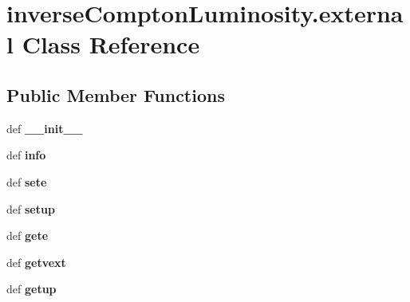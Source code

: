 \hypertarget{classinverseComptonLuminosity_1_1external}{\section{inverse\-Compton\-Luminosity.\-external Class Reference}
\label{classinverseComptonLuminosity_1_1external}
}
\subsection*{Public Member Functions}
\begin{DoxyCompactItemize}
\item 
\hypertarget{classinverseComptonLuminosity_1_1external_af5fb96626e93b5614098ff38ea14774f}{def {\bfseries \-\_\-\-\_\-init\-\_\-\-\_\-}}\label{classinverseComptonLuminosity_1_1external_af5fb96626e93b5614098ff38ea14774f}

\item 
\hypertarget{classinverseComptonLuminosity_1_1external_a41cf55021b554269855151e1a5bcc7f8}{def {\bfseries info}}\label{classinverseComptonLuminosity_1_1external_a41cf55021b554269855151e1a5bcc7f8}

\item 
\hypertarget{classinverseComptonLuminosity_1_1external_a270c543359039b87ac8ff64b60c0aac0}{def {\bfseries sete}}\label{classinverseComptonLuminosity_1_1external_a270c543359039b87ac8ff64b60c0aac0}

\item 
\hypertarget{classinverseComptonLuminosity_1_1external_aa216d3bc3ea503ce8262f1464e1625f4}{def {\bfseries setup}}\label{classinverseComptonLuminosity_1_1external_aa216d3bc3ea503ce8262f1464e1625f4}

\item 
\hypertarget{classinverseComptonLuminosity_1_1external_a2954db6592c8f398c71e06db9033a134}{def {\bfseries gete}}\label{classinverseComptonLuminosity_1_1external_a2954db6592c8f398c71e06db9033a134}

\item 
\hypertarget{classinverseComptonLuminosity_1_1external_a826d34afd8f3e606e0215d8c22711a8a}{def {\bfseries getvext}}\label{classinverseComptonLuminosity_1_1external_a826d34afd8f3e606e0215d8c22711a8a}

\item 
\hypertarget{classinverseComptonLuminosity_1_1external_ac68bed003d70f5aa10d4ab2d4cb3366d}{def {\bfseries getup}}\label{classinverseComptonLuminosity_1_1external_ac68bed003d70f5aa10d4ab2d4cb3366d}

\end{DoxyCompactItemize}
